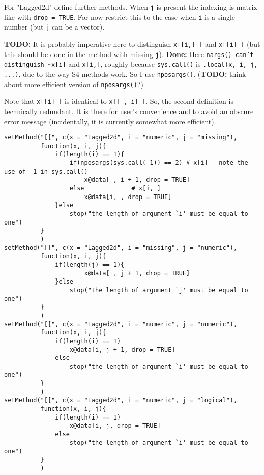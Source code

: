 \documentclass[11pt,a4paper]{article}
\begin{document}
For "Lagged2d" define further methods. When \texttt{j} is present the indexing is matrix-like with
\texttt{drop = TRUE}. For now restrict this to the case when \texttt{i} is a single number (but \texttt{j} can be
a vector). 

\textbf{TODO:} It is probably imperative here to distinguish \texttt{x[[i,] ]} and \texttt{x[[i] ]}
(but this should be done in the method with missing \texttt{j}).
\textbf{Done:} Here \texttt{nargs() can't distinguish \textasciitilde{}x[i]} and \texttt{x[i,]}, roughly because \texttt{sys.call()} is
\texttt{.local(x, i, j, ...)}, due to the way S4 methods work. So I use \texttt{nposargs()}. (\textbf{TODO:} think
about more efficient version of \texttt{nposargs()}?)

Note that \texttt{x[[i] ]} is identical to \texttt{x[[ , i] ]}. So, the second definition is technically
redundant. It is there for user's convenience and to avoid an obscure error message
(incidentally, it is currently somewhat more efficient).
\begin{verbatim}
setMethod("[[", c(x = "Lagged2d", i = "numeric", j = "missing"),
          function(x, i, j){
              if(length(i) == 1){
                  if(nposargs(sys.call(-1)) == 2) # x[i] - note the use of -1 in sys.call()
                      x@data[ , i + 1, drop = TRUE]
                  else             # x[i, ]
                      x@data[i, , drop = TRUE]
              }else
                  stop("the length of argument `i' must be equal to one")
          }
          )
setMethod("[[", c(x = "Lagged2d", i = "missing", j = "numeric"),
          function(x, i, j){
              if(length(j) == 1){
                      x@data[ , j + 1, drop = TRUE]
              }else
                  stop("the length of argument `j' must be equal to one")
          }
          )
setMethod("[[", c(x = "Lagged2d", i = "numeric", j = "numeric"),
          function(x, i, j){
              if(length(i) == 1)
                  x@data[i, j + 1, drop = TRUE]
              else
                  stop("the length of argument `i' must be equal to one")
          }
          )
setMethod("[[", c(x = "Lagged2d", i = "numeric", j = "logical"),
          function(x, i, j){
              if(length(i) == 1)
                  x@data[i, j, drop = TRUE]
              else
                  stop("the length of argument `i' must be equal to one")
          }
          )
\end{verbatim}
\end{document}
